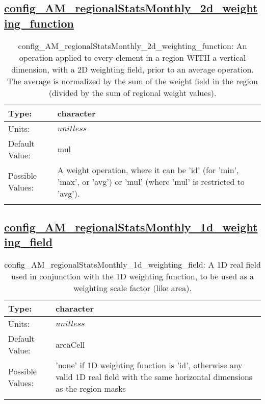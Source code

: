 \subsection[config\_AM\_regionalStatsMonthly\_2d\_weighting\_function]{\hyperref[sec:nm_tab_AM_regionalStatsMonthly]{config\_AM\_regionalStatsMonthly\_2d\_weighting\_function}}
\label{subsec:nm_sec_config_AM_regionalStatsMonthly_2d_weighting_function}
\begin{center}
\begin{longtable}{| p{2.0in} || p{4.0in} |}
    \hline
    Type: & character \\
    \hline
    Units: & $unitless$ \\
    \hline
    Default Value: & mul \\
    \hline
    Possible Values: & A weight operation, where it can be 'id' (for 'min', 'max', or 'avg') or 'mul' (where 'mul' is restricted to 'avg'). \\
    \hline
    \caption{config\_AM\_regionalStatsMonthly\_2d\_weighting\_function: An operation applied to every element in a region WITH a vertical dimension, with a 2D weighting field, prior to an average operation. The average is normalized by the sum of the weight field in the region (divided by the sum of regional weight values).}
\end{longtable}
\end{center}
\subsection[config\_AM\_regionalStatsMonthly\_1d\_weighting\_field]{\hyperref[sec:nm_tab_AM_regionalStatsMonthly]{config\_AM\_regionalStatsMonthly\_1d\_weighting\_field}}
\label{subsec:nm_sec_config_AM_regionalStatsMonthly_1d_weighting_field}
\begin{center}
\begin{longtable}{| p{2.0in} || p{4.0in} |}
    \hline
    Type: & character \\
    \hline
    Units: & $unitless$ \\
    \hline
    Default Value: & areaCell \\
    \hline
    Possible Values: & 'none' if 1D weighting function is 'id', otherwise any valid 1D real field with the same horizontal dimensions as the region masks \\
    \hline
    \caption{config\_AM\_regionalStatsMonthly\_1d\_weighting\_field: A 1D real field used in conjunction with the 1D weighting function, to be used as a weighting scale factor (like area).}
\end{longtable}
\end{center}
